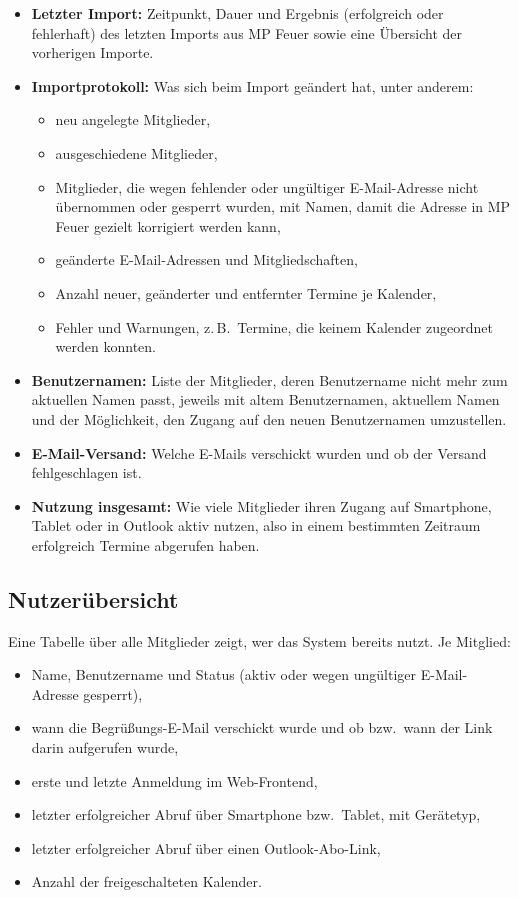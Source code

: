 \documentclass[a4paper,fontsize=10pt]{scrartcl}
\begin{document}
\begin{itemize}
  \item \textbf{Letzter Import:} Zeitpunkt, Dauer und Ergebnis
        (erfolgreich oder fehlerhaft) des letzten Imports aus MP Feuer sowie
        eine Übersicht der vorherigen Importe.
  \item \textbf{Importprotokoll:} Was sich beim Import geändert hat, unter
        anderem:
        \begin{itemize}
          \item neu angelegte Mitglieder,
          \item ausgeschiedene Mitglieder,
          \item Mitglieder, die wegen fehlender oder ungültiger E-Mail-Adresse
                nicht übernommen oder gesperrt wurden, mit Namen, damit die
                Adresse in MP Feuer gezielt korrigiert werden kann,
          \item geänderte E-Mail-Adressen und Mitgliedschaften,
          \item Anzahl neuer, geänderter und entfernter Termine je Kalender,
          \item Fehler und Warnungen, z.\,B.\ Termine, die keinem Kalender
                zugeordnet werden konnten.
        \end{itemize}
  \item \textbf{Benutzernamen:} Liste der Mitglieder, deren Benutzername
        nicht mehr zum aktuellen Namen passt, jeweils mit altem
        Benutzernamen, aktuellem Namen und der Möglichkeit, den Zugang auf
        den neuen Benutzernamen umzustellen.
  \item \textbf{E-Mail-Versand:} Welche E-Mails verschickt wurden und ob der
        Versand fehlgeschlagen ist.
  \item \textbf{Nutzung insgesamt:} Wie viele Mitglieder ihren Zugang auf
        Smartphone, Tablet oder in Outlook aktiv nutzen, also in einem
        bestimmten Zeitraum erfolgreich Termine abgerufen haben.
\end{itemize}

\subsection*{Nutzerübersicht}

Eine Tabelle über alle Mitglieder zeigt, wer das System bereits nutzt. Je
Mitglied:

\begin{itemize}
  \item Name, Benutzername und Status (aktiv oder wegen ungültiger
        E-Mail-Adresse gesperrt),
  \item wann die Begrüßungs-E-Mail verschickt wurde und ob bzw.\ wann der
        Link darin aufgerufen wurde,
  \item erste und letzte Anmeldung im Web-Frontend,
  \item letzter erfolgreicher Abruf über Smartphone bzw.\ Tablet, mit
        Gerätetyp,
  \item letzter erfolgreicher Abruf über einen Outlook-Abo-Link,
  \item Anzahl der freigeschalteten Kalender.
\end{itemize}
\end{document}
